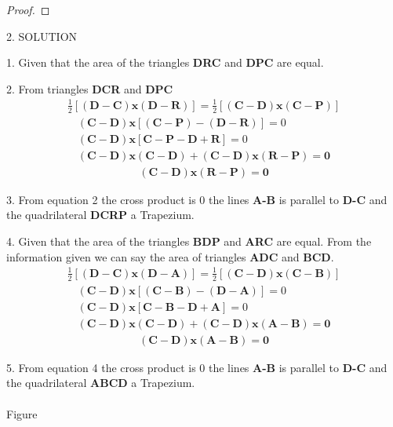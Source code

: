 \documentclass[a4paper,10pt]{report}
\let\vec\mathbf
\begin{document}
\begin{multicols}{2}
\begin{proof}
%

\end{proof}
  \iffalse

\centering \large\textsc{2.  S}\footnotesize\textsc{OLUTION}\vspace{5mm}\\ \raggedright\large 1. Given that the area of the triangles \textbf{DRC} and \textbf{DPC} are equal.\\
\raggedright \large 2. From triangles \textbf{DCR} and \textbf{DPC}
\begin{gather}
 \frac{1}{2} \vec{[(D-C)x(D-R)]} =  \frac{1}{2} \vec{[(C-D)x(C-P)
 ]}
\end{gather}
\begin{align*}
 \vec{(C-D) x [(C-P)-(D-R)]} = 0\\
 \vec{(C-D) x [C-P-D+R]} = 0 \\
 \vec{(C-D) x (C-D) + (C-D) x (R-P) = 0}
\end{align*} 
\begin{align}
\vec{(C-D) x (R-P) = 0}
\end{align}
\raggedright 3. From equation 2 the cross product is 0 the lines \textbf{A-B} is parallel to \textbf{D-C} and the quadrilateral \textbf{DCRP} a Trapezium.\\
\raggedright 4. Given that the area of the triangles \textbf{BDP} and \textbf{ARC} are equal. From the information given we can say the area of triangles \textbf{ADC} and \textbf{BCD}. 
\begin{gather}
\frac{1}{2} \vec{[(D-C)x(D-A)]} =  \frac{1}{2} \vec{[(C-D)x(C-B)]}
\end{gather}
\begin{align*}
 \vec{(C-D) x [(C-B)-(D-A)]} = 0\\
 \vec{(C-D) x [C-B-D+A]} = 0 \\
 \vec{(C-D) x (C-D) + (C-D) x (A-B) = 0}
\end{align*}
\begin{align}
\vec{(C-D) x (A-B) = 0}
\end{align}
\raggedright 5. From equation 4 the cross product is 0 the lines \textbf{A-B} is parallel to \textbf{D-C} and the quadrilateral \textbf{ABCD} a Trapezium.\\
\vspace{2mm}
\vspace{2mm}\\
\centering\normalsize{Figure}\vspace{5mm}\\



\end{multicols}
\end{document}
